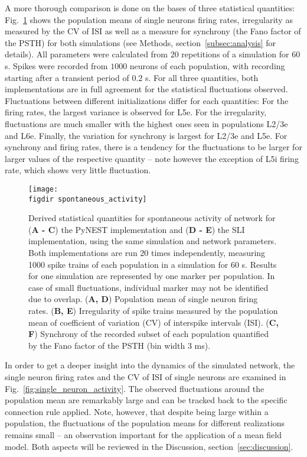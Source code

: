 A more thorough comparison is done on the bases of three statistical quantities: 
Fig.~\ref{fig:spontaneous_activity} shows the population means of single neurons firing rates, 
irregularity as measured by the CV of ISI as well as a measure for synchrony (the Fano factor of the 
PSTH) for both simulations (see Methods, section~\ref{subsec:analysis} for details). 
All parameters were calculated from $20$ repetitions of a simulation for 
$60$ s.
Spikes were recorded from $1000$ neurons of each population, with recording 
starting after a transient period of $0.2$ s. 
For all three quantities, both implementations are in full agreement for the statistical fluctuations
observed. Fluctuations between different initializations differ for each quantities: For the firing rates, 
the largest variance is observed for L5e. For the irregularity, fluctuations are much smaller with the 
highest ones seen in populations L2/3e and L6e. Finally, the variation for synchrony is largest for 
L2/3e and L5e. For synchrony and firing rates, there is a tendency for the fluctuations to be larger for larger
values of the respective quantity -- note however the exception of L5i firing rate, which shows very little
fluctuation.
\begin{figure}[tb]
    \centering
    \texttt{[image: \\figdir spontaneous\_activity]}
    \caption{
        Derived statistical quantities for spontaneous activity of network for
        (\textbf{A - C}) the PyNEST implementation and (\textbf{D - E}) the SLI implementation, 
        using the same simulation and network parameters.
        Both implementations are run $20$ times independently,
        measuring 1000 spike trains of each population in a simulation for 60 s.
        Results for one simulation are represented by one marker per population. In case of small 
        fluctuations, individual marker may not be identified due to overlap. 
        \quad (\textbf{A, D}) Population mean of single neuron firing rates.
        \quad (\textbf{B, E}) Irregularity of spike trains measured by the 
        population mean of coefficient of variation (CV) of interspike intervals (ISI).
        \quad (\textbf{C, F}) Synchrony of the recorded subset of each population quantified 
        by the Fano factor of the PSTH (bin width 3 ms).
    }
    \label{fig:spontaneous_activity}
\end{figure}

In order to get a deeper insight into the dynamics of the simulated network, the single neuron firing 
rates and the CV of ISI of single neurons are examined in Fig.~\ref{fig:single_neuron_activity}.
The observed fluctuations around the population mean are remarkably large and can 
be tracked back to the specific connection rule applied.
Note, however, that despite being large within a population, the 
fluctuations of the population means for different realizations remains small -- an observation 
important for the application of a mean field model. Both aspects will be reviewed in the 
Discussion, section~\ref{sec:discussion}. 

